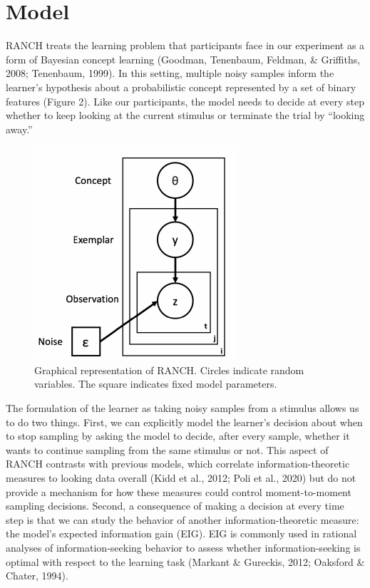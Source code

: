 \documentclass[10pt, letterpaper]{article}
\newenvironment{CodeChunk}{}{}
\begin{document}
\hypertarget{model}{%
\section{Model}\label{model}}

RANCH treats the learning problem that participants face in our
experiment as a form of Bayesian concept learning (Goodman, Tenenbaum,
Feldman, \& Griffiths, 2008; Tenenbaum, 1999). In this setting, multiple
noisy samples inform the learner's hypothesis about a probabilistic
concept represented by a set of binary features (Figure 2). Like our
participants, the model needs to decide at every step whether to keep
looking at the current stimulus or terminate the trial by ``looking
away.''

\begin{CodeChunk}
\begin{figure}[H]

{\centering \includegraphics{figs/plate_diagram-1} 

}

\caption[Graphical representation of RANCH]{Graphical representation of RANCH. Circles indicate random variables. The square indicates fixed model parameters.}\label{fig:plate_diagram}
\end{figure}
\end{CodeChunk}

The formulation of the learner as taking noisy samples from a stimulus
allows us to do two things. First, we can explicitly model the learner's
decision about when to stop sampling by asking the model to decide,
after every sample, whether it wants to continue sampling from the same
stimulus or not. This aspect of RANCH contrasts with previous models,
which correlate information-theoretic measures to looking data overall
(Kidd et al., 2012; Poli et al., 2020) but do not provide a mechanism
for how these measures could control moment-to-moment sampling
decisions. Second, a consequence of making a decision at every time step
is that we can study the behavior of another information-theoretic
measure: the model's expected information gain (EIG). EIG is commonly
used in rational analyses of information-seeking behavior to assess
whether information-seeking is optimal with respect to the learning task
(Markant \& Gureckis, 2012; Oaksford \& Chater, 1994).
\end{document}
